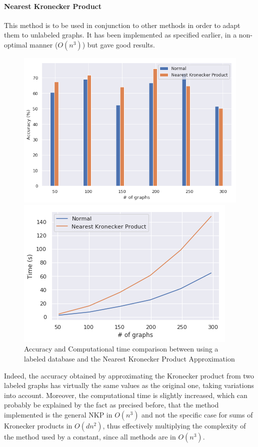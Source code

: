 \documentclass{article}
\theoremstyle{definition}
\begin{document}
\paragraph{Nearest Kronecker Product}
This method is to be used in conjunction to other methods in order to adapt them to unlabeled graphs. It has been implemented as specified earlier, in a non-optimal manner ($O(n^3)$) but gave good results. 
\begin{figure}[!htb]
	\begin{multicols}{2}
		\includegraphics[width=\linewidth]{data/nkp/acc.png}\par
		\includegraphics[width=\linewidth]{data/nkp/time.png}\par
	\end{multicols}
\caption{Accuracy and Computational time comparison between using a labeled database and the Nearest Kronecker Product Approximation}
\end{figure}Indeed, the accuracy obtained by approximating the Kronecker product from two labeled graphs has virtually the same values as the original one, taking variations into account. Moreover, the computational time is slightly increased, which can probably be explained by the fact as precised before, that the method implemented is the general NKP in $O(n^3)$ and not the specific case for sums of Kronecker products in $O(dn^2)$, thus effectively multiplying the complexity of the method used by a constant, since all methods are in $O(n^3)$.\\
\end{document}
